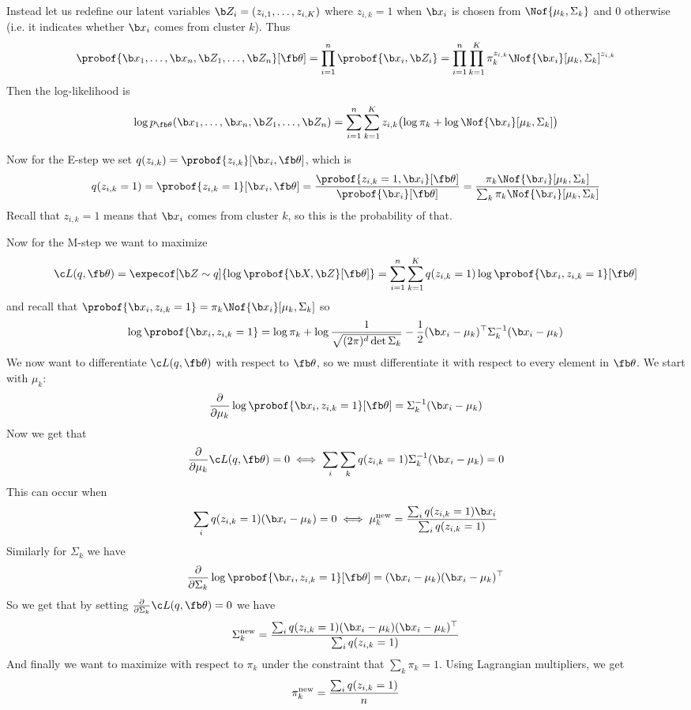 Instead let us redefine our latent variables $\b Z_i=(z_{i,1},\dots,z_{i,K})$ where $z_{i,k}=1$ when $\b x_i$ is chosen from $\Nof{\mu_k,\Sigma_k}$ and $0$ otherwise (i.e. it indicates whether $\b x_i$
comes from cluster $k$).
Thus
$$ \probof{\b x_1,\dots,\b x_n,\b Z_1,\dots,\b Z_n}[\fb\theta] = \prod_{i=1}^n\probof{\b x_i,\b Z_i} = \prod_{i=1}^n\prod_{k=1}^K\pi_k^{z_{i,k}}\Nof{\b x_i}[\mu_k,\Sigma_k]^{z_{i,k}} $$
Then the log-likelihood is
$$ \log p_{\fb\theta}(\b x_1,\dots,\b x_n,\b Z_1,\dots,\b Z_n) = \sum_{i=1}^n\sum_{k=1}^Kz_{i,k}\bigl(\log\pi_k+\log\Nof{\b x_i}[\mu_k,\Sigma_k]\bigr) $$

Now for the E-step we set $q(z_{i,k})=\probof{z_{i,k}}[\b x_i,\fb\theta]$, which is
$$ q(z_{i,k}=1) = \probof{z_{i,k}=1}[\b x_i,\fb\theta] = \frac{\probof{z_{i,k}=1,\b x_i}[\fb\theta]}{\probof{\b x_i}[\fb\theta]} =
\frac{\pi_k\Nof{\b x_i}[\mu_k,\Sigma_k]}{\sum_k\pi_k\Nof{\b x_i}[\mu_k,\Sigma_k]} $$
Recall that $z_{i,k}=1$ means that $\b x_i$ comes from cluster $k$, so this is the probability of that.

Now for the M-step we want to maximize
$$ \c L(q,\fb\theta) = \expecof[\b Z\sim q]{\log\probof{\b X,\b Z}[\fb\theta]} = \sum_{i=1}^n\sum_{k=1}^Kq(z_{i,k}=1)\log\probof{\b x_i,z_{i,k}=1}[\fb\theta] $$
and recall that $\probof{\b x_i,z_{i,k}=1} = \pi_k\Nof{\b x_i}[\mu_k,\Sigma_k]$ so
$$ \log\probof{\b x_i,z_{i,k}=1} = \log\pi_k + \log\frac1{\sqrt{(2\pi)^d\det\Sigma_k}} - \frac12(\b x_i-\mu_k)^\top\Sigma_k^{-1}(\b x_i-\mu_k) $$
We now want to differentiate $\c L(q,\fb\theta)$ with respect to $\fb\theta$, so we must differentiate it with respect to every element in $\fb\theta$.
We start with $\mu_k$:
$$ \frac\partial{\partial\mu_k}\log\probof{\b x_i,z_{i,k}=1}[\fb\theta] = \Sigma_k^{-1}(\b x_i-\mu_k) $$
Now we get that
$$ \frac\partial{\partial\mu_k}\c L(q,\fb\theta) = 0 \iff \sum_i\sum_kq(z_{i,k}=1)\Sigma_k^{-1}(\b x_i-\mu_k) = 0 $$
This can occur when
$$ \sum_iq(z_{i,k}=1)(\b x_i-\mu_k) = 0 \iff \mu_k^{\rm new} = \frac{\sum_iq(z_{i,k}=1)\b x_i}{\sum_iq(z_{i,k}=1)} $$
Similarly for $\Sigma_k$ we have
$$ \frac\partial{\partial\Sigma_k}\log\probof{\b x_i,z_{i,k}=1}[\fb\theta] = (\b x_i-\mu_k)(\b x_i-\mu_k)^\top $$
So we get that by setting $\frac\partial{\partial\Sigma_k}\c L(q,\fb\theta)=0$ we have
$$ \Sigma_k^{\rm new} = \frac{\sum_iq(z_{i,k}=1)(\b x_i-\mu_k)(\b x_i-\mu_k)^\top}{\sum_iq(z_{i,k}=1)} $$
And finally we want to maximize with respect to $\pi_k$ under the constraint that $\sum_k\pi_k=1$.
Using Lagrangian multipliers, we get
$$ \pi_k^{\rm new} = \frac{\sum_iq(z_{i,k}=1)}n $$

